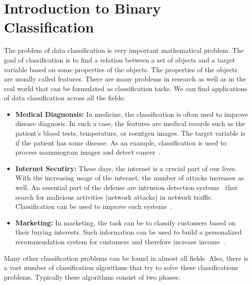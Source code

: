 \chapter{Introduction to Binary Classification}


The problem of data classification is very important mathematical problem. The goal of classification is to find a relation between a set of objects and a target variable based on some properties of the objects. The properties of the objects are usually called features. There are many problems in research as well as in the real world that can be formulated as classification tasks. We can find applications of data classification across all the fields:
\begin{itemize}
  \item \textbf{Medical Diagnonsis:} In medicine, the classification is often used to improve disease diagnosis. In such a case, the features are medical records such as the patient's blood tests, temperature, or roentgen images. The target variable is if the patient has some disease. As an example, classification is used to process mammogram images and detect cancer~\cite{viale2012current, levy2016breast}.
  \item \textbf{Internet Secutiry:} These days, the internet is a crucial part of our lives. With the increasing usage of the internet, the number of attacks increases as well. An essential part of the defense are intrusion detection systems~\cite{grill2016learning, scarfone2007guide} that search for malicious activities (network attacks) in network traffic. Classification can be used to improve such systems~\cite{giacinto2002intrusion, shanbhag2009accurate}.
  \item \textbf{Marketing:} In marketing, the task can be to classify customers based on their buying interests. Such information can be used to build a personalized recommendation system for customers and therefore increase income~\cite{kaefer2005neural, zhang2007building}.
\end{itemize}
Many other classification problems can be found in almost all fields. Also, there is a vast number of classification algorithms that try to solve these classifications problems. Typically these algorithms consist of two phases:
